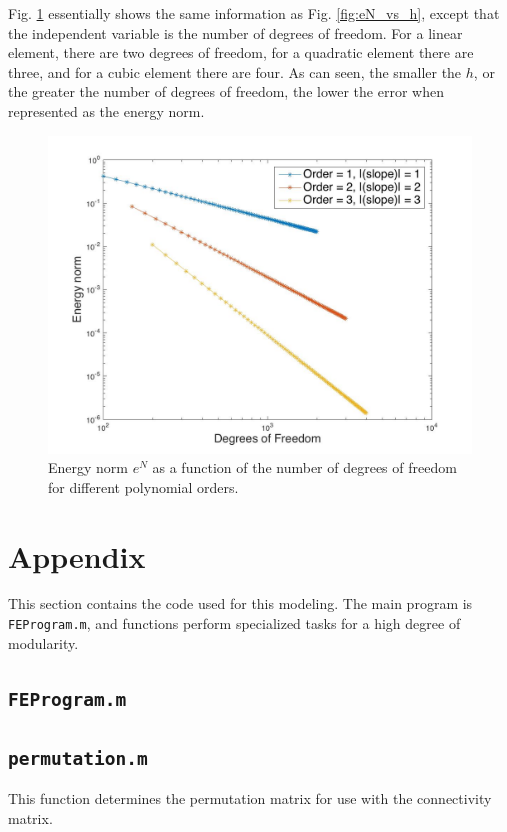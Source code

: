 \documentclass[10pt]{article}
\begin{document}
Fig. \ref{fig:eN_vs_dof} essentially shows the same information as Fig. \ref{fig:eN_vs_h}, except that the independent variable is the number of degrees of freedom. For a linear element, there are two degrees of freedom, for a quadratic element there are three, and for a cubic element there are four. As can seen, the smaller the \(h\), or the greater the number of degrees of freedom, the lower the error when represented as the energy norm.

\begin{figure}[H]
  \centering
  \includegraphics[width=13cm]{eN_vs_dof.jpg}
  \caption{Energy norm \(e^N\) as a function of the number of degrees of freedom for different polynomial orders.}
  \label{fig:eN_vs_dof}
\end{figure}

\section{Appendix}

This section contains the code used for this modeling. The main program is \texttt{FEProgram.m}, and functions perform specialized tasks for a high degree of modularity.

\subsection{\texttt{FEProgram.m}}


\subsection{\texttt{permutation.m}}
This function determines the permutation matrix for use with the connectivity matrix.

\end{document}

